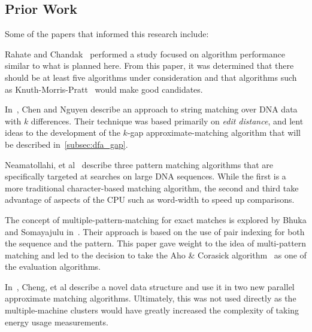 \subsection{Prior Work}

Some of the papers that informed this research include:

Rahate and Chandak~\cite{rahate} performed a study focused on algorithm performance similar to what is planned here. From this paper, it was determined that there should be at least five algorithms under consideration and that algorithms such as Knuth-Morris-Pratt~\cite{knuth} would make good candidates.

In~\cite{chen2021string}, Chen and Nguyen describe an approach to string matching over DNA data with $k$ differences. Their technique was based primarily on \textit{edit distance}, and lent ideas to the development of the $k$-gap approximate-matching algorithm that will be described in~\ref{subsec:dfa_gap}.

Neamatollahi, et al~\cite{neamatollahi} describe three pattern matching algorithms that are specifically targeted at searches on large DNA sequences. While the first is a more traditional character-based matching algorithm, the second and third take advantage of aspects of the CPU such as word-width to speed up comparisons.

The concept of multiple-pattern-matching for exact matches is explored by Bhuka and Somayajulu in~\cite{bhukya}. Their approach is based on the use of pair indexing for both the sequence and the pattern. This paper gave weight to the idea of multi-pattern matching and led to the decision to take the Aho \& Corasick algorithm~\cite{aho} as one of the evaluation algorithms.

In~\cite{cheng2003approximate}, Cheng, et al describe a novel data structure and use it in two new parallel approximate matching algorithms. Ultimately, this was not used directly as the multiple-machine clusters would have greatly increased the complexity of taking energy usage measurements.
